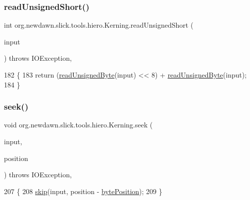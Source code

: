 \subsubsection{\texorpdfstring{read\+Unsigned\+Short()}{readUnsignedShort()}}
{\footnotesize\ttfamily int org.\+newdawn.\+slick.\+tools.\+hiero.\+Kerning.\+read\+Unsigned\+Short (\begin{DoxyParamCaption}\item[{Input\+Stream}]{input }\end{DoxyParamCaption}) throws I\+O\+Exception\hspace{0.3cm}{\ttfamily [inline]}, {\ttfamily [private]}}


\begin{DoxyCode}
182                                                                          \{
183         \textcolor{keywordflow}{return} (\mbox{\hyperlink{classorg_1_1newdawn_1_1slick_1_1tools_1_1hiero_1_1_kerning_a433922be5e8ae2ea7ebecc17adb480d1}{readUnsignedByte}}(input) << 8) + \mbox{\hyperlink{classorg_1_1newdawn_1_1slick_1_1tools_1_1hiero_1_1_kerning_a433922be5e8ae2ea7ebecc17adb480d1}{readUnsignedByte}}(input);
184     \}
\end{DoxyCode}
\mbox{\label{classorg_1_1newdawn_1_1slick_1_1tools_1_1hiero_1_1_kerning_a67a8ed1a557f152dab4fe70c02c1a5e9}} 
\subsubsection{\texorpdfstring{seek()}{seek()}}
{\footnotesize\ttfamily void org.\+newdawn.\+slick.\+tools.\+hiero.\+Kerning.\+seek (\begin{DoxyParamCaption}\item[{Input\+Stream}]{input,  }\item[{long}]{position }\end{DoxyParamCaption}) throws I\+O\+Exception\hspace{0.3cm}{\ttfamily [inline]}, {\ttfamily [private]}}


\begin{DoxyCode}
207                                                                             \{
208         \mbox{\hyperlink{classorg_1_1newdawn_1_1slick_1_1tools_1_1hiero_1_1_kerning_afa04157519725497f528b5bc175f1abb}{skip}}(input, position - \mbox{\hyperlink{classorg_1_1newdawn_1_1slick_1_1tools_1_1hiero_1_1_kerning_a6c58cfffdf2d5619a257504e489deb1b}{bytePosition}});
209     \}
\end{DoxyCode}
\mbox{\label{classorg_1_1newdawn_1_1slick_1_1tools_1_1hiero_1_1_kerning_afa04157519725497f528b5bc175f1abb}} 
